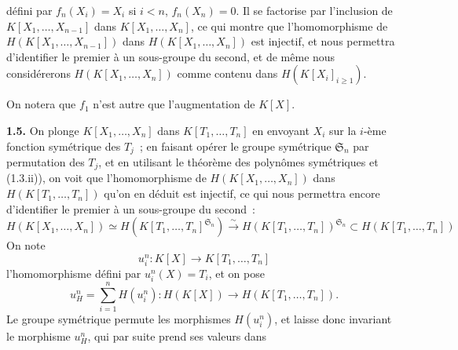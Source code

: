 défini par \(f_n(X_i)=X_i\) si \(i<n\), \(f_n(X_n)=0\). Il se factorise par l'inclusion de \(K[X_1,\ldots,X_{n-1}]\) dans \(K[X_1,\ldots,X_n]\), ce qui montre que l'homomorphisme de \(H(K[X_1,\ldots,X_{n-1}])\) dans \(H(K[X_1,\ldots,X_n])\) est injectif, et nous permettra d'identifier le premier à un sous-groupe du second, et de même nous considérerons \(H(K[X_1,\ldots,X_n])\) comme contenu dans \(H(K[X_i]_{i\geq 1})\).

On notera que \(f_1\) n'est autre que l'augmentation de \(K[X]\).

\textbf{1.5.} On plonge \(K[X_1,\ldots,X_n]\) dans \(K[T_1,\ldots,T_n]\) en envoyant \(X_i\) sur la \(i\)-ème fonction symétrique des \(T_j\)~; en faisant opérer le groupe symétrique \(\mathfrak S_n\) par permutation des \(T_j\), et en utilisant le théorème des polynômes symétriques et (1.3.ii)), on voit que l'homomorphisme de \(H(K[X_1,\ldots,X_n])\) dans \(H(K[T_1,\ldots,T_n])\) qu'on en déduit est injectif, ce qui nous permettra encore d'identifier le premier à un sous-groupe du second~:
\[
  H(K[X_1,\ldots,X_n])\simeq H(K[T_1,\ldots,T_n]^{\mathfrak S_n})\xrightarrow{\sim} H(K[T_1,\ldots,T_n])^{\mathfrak S_n}\subset H(K[T_1,\ldots,T_n])
\]%
On note
\[
  u_i^n:K[X]\longrightarrow K[T_1,\ldots,T_n]
\]
l'homomorphisme défini par \(u_i^n(X)=T_i\), et on pose
\[
  u_H^n=\sum_{i=1}^n H(u_i^n):H(K[X])\longrightarrow H(K[T_1,\ldots,T_n]).
\]
Le groupe symétrique permute les morphismes \(H(u_i^n)\), et laisse donc invariant le morphisme \(u_H^n\), qui par suite prend ses valeurs dans
